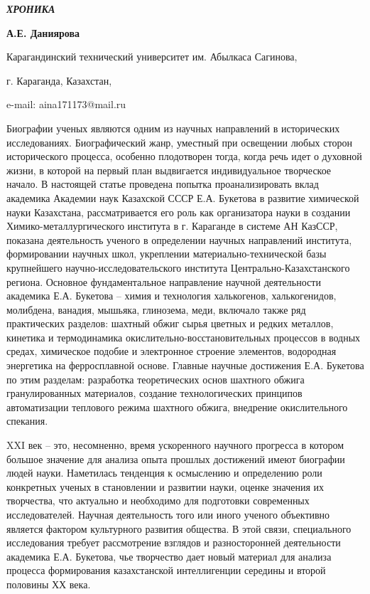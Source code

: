 \emph{{\bfseries ХРОНИКА}}


\begin{center}
{\bfseries А.Е. Даниярова}

Карагандинский технический университет им. Абылкаса Сагинова,

г. Караганда, Казахстан,

e-mail: aina171173@mail.ru
\end{center}

\begin{multicols}{2}
Биографии ученых являются одним из научных направлений в исторических
исследованиях. Биографический жанр, уместный при освещении любых сторон
исторического процесса, особенно плодотворен тогда, когда речь идет о
духовной жизни, в которой на первый план выдвигается индивидуальное
творческое начало. В настоящей статье проведена попытка проанализировать
вклад академика Академии наук Казахской СССР Е.А. Букетова в развитие
химической науки Казахстана, рассматривается его роль как организатора
науки в создании Химико-металлургического института в г. Караганде в
системе АН КазССР, показана деятельность ученого в определении научных
направлений института, формировании научных школ, укреплении
материально-технической базы крупнейшего научно-исследовательского
института Центрально-Казахстанского региона. Основное фундаментальное
направление научной деятельности академика Е.А. Букетова -- химия и
технология халькогенов, халькогенидов, молибдена, ванадия, мышьяка,
глинозема, меди, включало также ряд практических разделов: шахтный обжиг
сырья цветных и редких металлов, кинетика и термодинамика
окислительно-восстановительных процессов в водных средах, химическое
подобие и электронное строение элементов, водородная энергетика на
ферросплавной основе. Главные научные достижения Е.А. Букетова по этим
разделам: разработка теоретических основ шахтного обжига гранулированных
материалов, создание технологических принципов автоматизации теплового
режима шахтного обжига, внедрение окислительного спекания.

XXI век -- это, несомненно, время ускоренного научного прогресса в
котором большое значение для анализа опыта прошлых достижений имеют
биографии людей науки. Наметилась тенденция к осмыслению и определению
роли конкретных ученых в становлении и развитии науки, оценке значения
их творчества, что актуально и необходимо для подготовки современных
исследователей. Научная деятельность того или иного ученого объективно
является фактором культурного развития общества. В этой связи,
специального исследования требует рассмотрение взглядов и разносторонней
деятельности академика Е.А. Букетова, чье творчество дает новый материал
для анализа процесса формирования казахстанской интеллигенции середины и
второй половины ХХ века.


\end{multicols}
